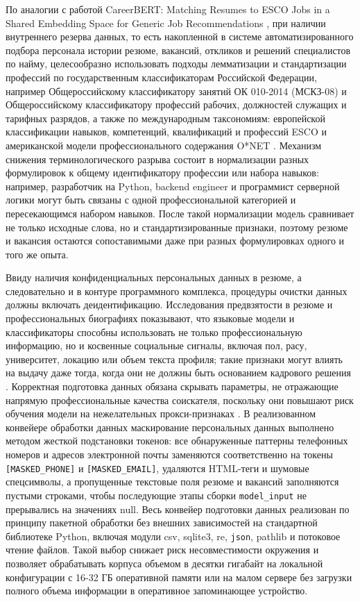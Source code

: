 По аналогии с работой CareerBERT: Matching Resumes to ESCO Jobs in a Shared Embedding Space for Generic Job Recommendations \cite{src01}, при наличии внутреннего резерва данных, то есть накопленной в системе автоматизированного подбора персонала истории резюме, вакансий, откликов и решений специалистов по найму, целесообразно использовать подходы лемматизации и стандартизации профессий по государственным классификаторам Российской Федерации, например Общероссийскому классификатору занятий ОК 010-2014 (МСКЗ-08) и Общероссийскому классификатору профессий рабочих, должностей служащих и тарифных разрядов, а также по международным таксономиям: европейской классификации навыков, компетенций, квалификаций и профессий ESCO и американской модели профессионального содержания O*NET \cite{src30, src31}. Механизм снижения терминологического разрыва состоит в нормализации разных формулировок к общему идентификатору профессии или набора навыков: например, разработчик на Python, backend engineer и программист серверной логики могут быть связаны с одной профессиональной категорией и пересекающимся набором навыков. После такой нормализации модель сравнивает не только исходные слова, но и стандартизированные признаки, поэтому резюме и вакансия остаются сопоставимыми даже при разных формулировках одного и того же опыта.

Ввиду наличия конфиденциальных персональных данных в резюме, а следовательно и в контуре программного комплекса, процедуры очистки данных должны включать деидентификацию. Исследования предвзятости в резюме и профессиональных биографиях показывают, что языковые модели и классификаторы способны использовать не только профессиональную информацию, но и косвенные социальные сигналы, включая пол, расу, университет, локацию или объем текста профиля; такие признаки могут влиять на выдачу даже тогда, когда они не должны быть основанием кадрового решения \cite{src22, src34, src35}. Корректная подготовка данных обязана скрывать параметры, не отражающие напрямую профессиональные качества соискателя, поскольку они повышают риск обучения модели на нежелательных прокси-признаках \cite{src02, src22}. В реализованном конвейере обработки данных маскирование персональных данных выполнено методом жесткой подстановки токенов: все обнаруженные паттерны телефонных номеров и адресов электронной почты заменяются соответственно на токены \texttt{{[}MASKED\_PHONE{]}} и \texttt{{[}MASKED\_EMAIL{]}}, удаляются HTML-теги и шумовые спецсимволы, а пропущенные текстовые поля резюме и вакансий заполняются пустыми строками, чтобы последующие этапы сборки \texttt{model\_input} не прерывались на значениях null. Весь конвейер подготовки данных реализован по принципу пакетной обработки без внешних зависимостей на стандартной библиотеке Python, включая модули csv, sqlite3, re, \texttt{json}, pathlib и потоковое чтение файлов. Такой выбор снижает риск несовместимости окружения и позволяет обрабатывать корпуса объемом в десятки гигабайт на локальной конфигурации с 16-32 ГБ оперативной памяти или на малом сервере без загрузки полного объема информации в оперативное запоминающее устройство.

